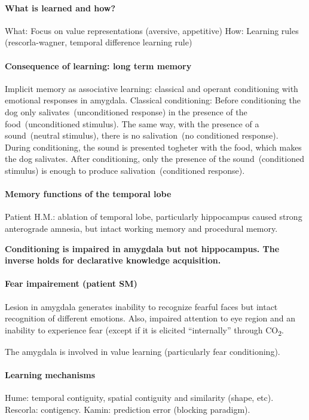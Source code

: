 \documentclass[12pt,article,oneside,a4paper]{memoir}
\begin{document}
\paragraph{What is learned and how?}
What: Focus on value representations (aversive, appetitive)
How: Learning rules (rescorla-wagner, temporal difference learning rule)

\paragraph{Consequence of learning: long term memory}
Implicit memory as associative learning: classical and operant conditioning
with emotional responses in amygdala.
Classical conditioning: Before conditioning the dog only
salivates~(unconditioned response) in the presence of the food~(unconditioned stimulus).
The same way, with the presence of a sound~(neutral stimulus), there is no
salivation~(no conditioned response). During conditioning, the sound is
presented togheter with the food, which makes the dog salivates. After
conditioning, only the presence of the sound~(conditioned stimulus) is enough
to produce salivation~(conditioned response).

\paragraph{Memory functions of the temporal lobe}
Patient H.M.: ablation of temporal lobe, particularly hippocampus caused strong
anterograde amnesia, but intact working memory and procedural memory.

\textbf{Conditioning is impaired in amygdala but not hippocampus. The inverse
holds for declarative knowledge acquisition.}

\paragraph{Fear impairement (patient SM)}
Lesion in amygdala generates inability to recognize fearful faces but intact
recognition of different emotions. Also, impaired attention to eye region and
an inability to experience fear (except if it is elicited ``internally''
through CO\textsubscript{2}.

The amygdala is involved in value learning (particularly fear conditioning).

\paragraph{Learning mechanisms}
Hume: temporal contiguity, spatial contiguity and similarity (shape, etc).
Rescorla: contigency.
Kamin: prediction error (blocking paradigm).
\end{document}
